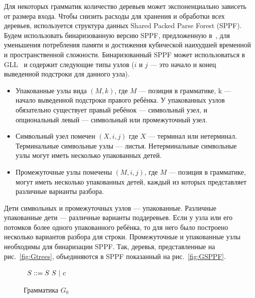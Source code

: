 \documentclass[14pt]{matmex-diploma-custom}
\begin{document}
    Для некоторых грамматик количество деревьев может экспоненциально зависеть от размера входа.
    Чтобы снизить расходы для хранения и обработки всех деревьев, используется структура данных
    Shared Packed Parse Forest (SPPF). 
    Будем использовать бинаризованную версию SPPF, предложенную в~\cite{brnglr}, для уменьшения
    потребления памяти и достижения кубической наихудшей временной и пространственной сложности.
    Бинаризованный SPPF может использоваться в GLL~\cite{scott2013gll} и содержит следующие типы узлов
    ($i$ и $j$ --- это начало и конец выведенной подстроки для данного узла).
    \begin{itemize}
        \item Упакованные узлы вида $(M, k)$, где $M$ --- позиция в грамматике, k --- начало выведенной
        подстроки правого ребёнка. У упакованных узлов обязательно существует правый ребёнок ---
        символьный узел, и опциональный левый --- символьный или промежуточный узел.
        \item Символьный узел помечен $(X, i, j)$ где $X$ --- терминал или нетерминал.
        Терминальные символьные узлы --- листья. 
        Нетерминальные символьные узлы могут иметь несколько упакованных детей. 
        \item Промежуточные узлы помечены $ (M, i, j) $, где $M$ --- позиция в грамматике, 
        могут иметь несколько упакованных детей, каждый из которых представляет различные варианты разбора.
    \end{itemize}
    Дети символьных и промежуточных узлов --- упакованные. Различные упакованные дети --- различные варианты поддеревьев.
    Если у узла или его потомков более одного упакованного ребёнка, то для него было построено несколько вариантов 
    разбора для строки. Промежуточные и упакованные узлы необходимы для бинаризации SPPF.
    Так, деревья, представленные на рис.~\ref{fig:Gtrees}, объединяются в SPPF показанный на рис.~\ref{fig:GSPPF}.
    \begin{figure}
        \centering
        $
        \begin{array}[b]{rl}
        S ::= S\ S\ | \ c \ \ \ 
        \end{array}
        $
        \caption{Грамматика $G_0$}
        \label{fig:fig0}
    \end{figure}
\end{document}
